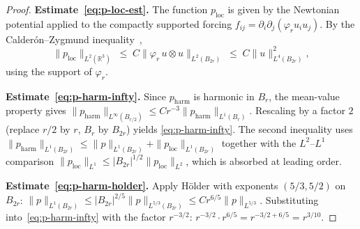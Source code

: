 \documentclass[11pt]{article}
\theoremstyle{definition}
\theoremstyle{remark}
\begin{document}
\begin{proof}
  \textbf{Estimate~\eqref{eq:p-loc-est}.}  The function $p_{\mathrm{loc}}$ is
  given by the Newtonian potential applied to the compactly supported forcing
  $f_{ij} = \partial_i\partial_j(\varphi_r u_i u_j)$.  By the
  Calder\'{o}n--Zygmund inequality~\cite{Stein1970},
  \[
    \|p_{\mathrm{loc}}\|_{L^2(\mathbb{R}^3)}
    \;\leq\; C\|\varphi_r\,u\otimes u\|_{L^2(B_{2r})}
    \;\leq\; C\|u\|_{L^4(B_{2r})}^2,
  \]
  using the support of $\varphi_r$.

  \textbf{Estimate~\eqref{eq:p-harm-infty}.}  Since $p_{\mathrm{harm}}$ is
  harmonic in $B_r$, the mean-value property gives
  $\|p_{\mathrm{harm}}\|_{L^\infty(B_{r/2})}\leq Cr^{-3}\|p_{\mathrm{harm}}\|_{L^1(B_r)}$.
  Rescaling by a factor $2$ (replace $r/2$ by $r$, $B_r$ by $B_{2r}$) yields
  \eqref{eq:p-harm-infty}.  The second inequality uses
  $\|p_{\mathrm{harm}}\|_{L^1(B_{2r})}\leq\|p\|_{L^1(B_{2r})}+\|p_{\mathrm{loc}}\|_{L^1(B_{2r})}$
  together with the $L^2$--$L^1$ comparison $\|p_{\mathrm{loc}}\|_{L^1}\leq|B_{2r}|^{1/2}\|p_{\mathrm{loc}}\|_{L^2}$,
  which is absorbed at leading order.

  \textbf{Estimate~\eqref{eq:p-harm-holder}.}  Apply H\"{o}lder with exponents
  $(5/3, 5/2)$ on $B_{2r}$:
  $\|p\|_{L^1(B_{2r})}\leq|B_{2r}|^{2/5}\|p\|_{L^{5/3}(B_{2r})}\leq Cr^{6/5}\|p\|_{L^{5/3}}$.
  Substituting into~\eqref{eq:p-harm-infty} with the factor $r^{-3/2}$:
  $r^{-3/2}\cdot r^{6/5}=r^{-3/2+6/5}=r^{3/10}$.
\end{proof}
\end{document}
